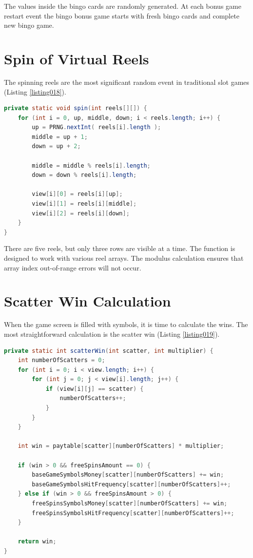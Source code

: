 \documentclass[12pt,twoside,openany]{book}
\begin{document}
The values inside the bingo cards are randomly generated. At each bonus game restart event the bingo bonus game starts with fresh bingo cards and complete new bingo game.

\section*{Spin of Virtual Reels}

The spinning reels are the most significant random event in traditional slot games (Listing \ref{listing018}).

\begin{lstlisting}[language=Java, caption={Reels spin}, label=listing018]
private static void spin(int reels[][]) {
	for (int i = 0, up, middle, down; i < reels.length; i++) {
		up = PRNG.nextInt( reels[i].length );
		middle = up + 1;
		down = up + 2;

		middle = middle % reels[i].length;
		down = down % reels[i].length;

		view[i][0] = reels[i][up];
		view[i][1] = reels[i][middle];
		view[i][2] = reels[i][down];
	}
}
\end{lstlisting}

There are five reels, but only three rows are visible at a time. The function is designed to work with various reel arrays. The modulus calculation ensures that array index out-of-range errors will not occur.

\section*{Scatter Win Calculation}

When the game screen is filled with symbols, it is time to calculate the wins. The most straightforward calculation is the scatter win (Listing \ref{listing019}).

\begin{lstlisting}[language=Java, caption={Scatters win calculation}, label=listing019]
private static int scatterWin(int scatter, int multiplier) {
	int numberOfScatters = 0;
	for (int i = 0; i < view.length; i++) {
		for (int j = 0; j < view[i].length; j++) {
			if (view[i][j] == scatter) {
				numberOfScatters++;
			}
		}
	}

	int win = paytable[scatter][numberOfScatters] * multiplier;

	if (win > 0 && freeSpinsAmount == 0) {
		baseGameSymbolsMoney[scatter][numberOfScatters] += win;
		baseGameSymbolsHitFrequency[scatter][numberOfScatters]++;
	} else if (win > 0 && freeSpinsAmount > 0) {
		freeSpinsSymbolsMoney[scatter][numberOfScatters] += win;
		freeSpinsSymbolsHitFrequency[scatter][numberOfScatters]++;
	}

	return win;
}
\end{lstlisting}
\end{document}
